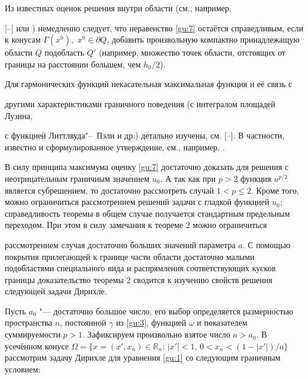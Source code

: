 \smallskip



\begin{remark} Из известных оценок решения внутри области (см., например,

[--] или \cite{MSB12}) немедленно следует, что неравенство \eqref{gu:7} остаётся справедливым, если к конусам $\Gamma (x^0),$ $x^0 \in \partial Q$, добавить произвольную компактно принадлежащую области $Q$ подобласть $Q'$ (например, множество точек области, отстоящих от границы на расстоянии большем, чем $h_0/2$).

\end{remark}





\smallskip



Для гармонических функций некасательная максимальная функция и её связь с

другими характеристиками граничного поведения (с интегралом площадей Лузина,

с функцией Литтлвуда"--~Пэли и др.) детально изучены, см. [--]. В частности, известно и сформулированное утверждение, см., например, \cite{Dahlb}.



В силу принципа максимума оценку \eqref{gu:7} достаточно доказать для решения с неотрицательным граничным значением $u_0$. А так как при $p > 2$ функция $u^{p/2}$ является субрешением, то достаточно рассмотреть случай $1 < p \leq 2$. Кроме того, можно ограничиться рассмотрением решений задачи с гладкой функцией $u_0$; справедливость теоремы в общем случае получается стандартным предельным переходом. При этом в силу замечания к теореме 2 можно ограничиться

рассмотрением случая достаточно больших значений параметра $a$. С помощью покрытия прилегающей к границе части области достаточно малыми подобластями специального вида и распрямления соответствующих кусков границы доказательство теоремы 2 сводится к изучению свойств решения следующей задачи Дирихле. 



Пусть $a_0$ "---  достаточно большое число, его выбор определяется размерностью пространства $n$, постоянной $\gamma$ из \eqref{gu:3}, функцией $\omega$ и показателем суммируемости $p > 1$. Зафиксируем произвольно взятое число $a > a_0$. В усечённом конусе $\Omega = \{ x = (x', x_n) \in {\mathbb R}_n: \, |x'| < 1, \, 0 < x_n < ({1 - |x'|})/{a} \}$ рассмотрим задачу Дирихле для уравнения \eqref{gu:1} со следующим граничным условием:

